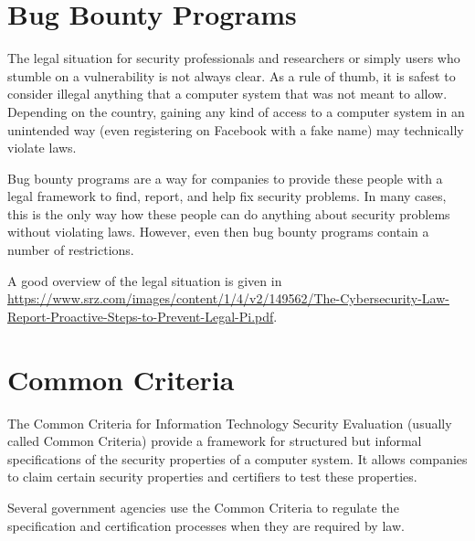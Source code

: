 \section{Bug Bounty Programs}

The legal situation for security professionals and researchers or simply users who stumble on a vulnerability is not always clear.
As a rule of thumb, it is safest to consider illegal anything that a computer system that was not meant to allow.
Depending on the country, gaining any kind of access to a computer system in an unintended way (even registering on Facebook with a fake name) may technically violate laws.

Bug bounty programs are a way for companies to provide these people with a legal framework to find, report, and help fix security problems.
In many cases, this is the only way how these people can do anything about security problems without violating laws.
However, even then bug bounty programs contain a number of restrictions.

A good overview of the legal situation is given in \url{https://www.srz.com/images/content/1/4/v2/149562/The-Cybersecurity-Law-Report-Proactive-Steps-to-Prevent-Legal-Pi.pdf}.

\section{Common Criteria}

The Common Criteria for Information Technology Security Evaluation (usually called Common Criteria) provide a framework for structured but informal specifications of the security properties of a computer system.
It allows companies to claim certain security properties and certifiers to test these properties.

Several government agencies use the Common Criteria to regulate the specification and certification processes when they are required by law.
